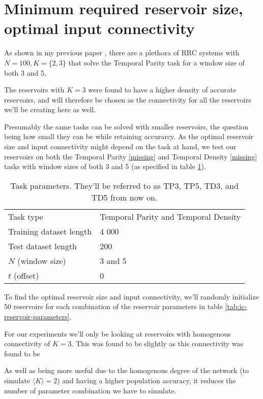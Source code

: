 \section{Minimum required reservoir size, optimal input connectivity}

As shown in my previous paper \cite{MyPreviousPaper},
there are a plethora of RRC systems with $N=100, K=\{2, 3\}$ that solve the Temporal Parity task for a window size of both 3 and 5,

The reservoirs with $K=3$ were found to have a higher density of accurate reservoirs,
and will therefore be chosen as the connectivity for all the reservoirs we'll be creating here as well.

Presumably the same tasks can be solved with smaller reservoirs,
the question being how small they can be while retaining accurarcy.
As the optimal reservoir size and input connectivity might depend on the task at hand,
we test our reservoirs on both the Temporal Parity \ref{missing} and Temporal Density \ref{missing}
tasks with window sizes of both 3 and 5 (as specified in table \ref{tab:tasks}).

\begin{table}[ht]
  \centering
  \caption{Task parameters. They'll be referred to as TP3, TP5, TD3, and TD5 from now on.}
  \label{tab:tasks}
  \begin{tabular}{ll}
    Task type               & Temporal Parity and Temporal Density \\
    Training dataset length & 4 000                       \\
    Test dataset length     & 200                         \\
    $N$ (window size)       & 3 and 5                     \\
    $t$ (offset)            & 0
  \end{tabular}
\end{table}

To find the optimal reservoir size and input connectivity,
we'll randomly initialize 50 reservoirs for each combination of the reservoir parameters in table \ref{tab:ic-reservoir-parameters}.

For our experiments we'll only be looking at reservoirs with homogenous connectivity of $K=3$.
This was found to be slightly
as this connectivity was found to be 

As well as being more useful due to the homogenous degree of the network (to simulate $\langle K \rangle = 2 $) and
having a higher population accuracy, it reduces the number of parameter combination we have to simulate.

